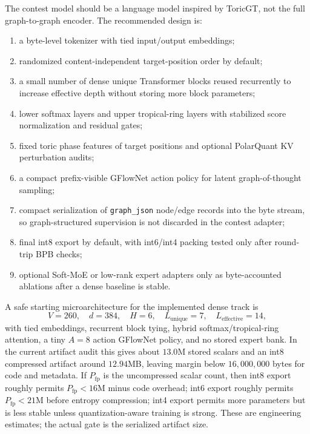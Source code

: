 \documentclass[11pt]{article}
\theoremstyle{definition}
\theoremstyle{plain}
\theoremstyle{remark}
\numberwithin{equation}{section}
\begin{document}
The contest model should be a language model inspired by ToricGT, not the full graph-to-graph encoder.  The recommended design is:
\begin{enumerate}[leftmargin=2em]
  \item a byte-level tokenizer with tied input/output embeddings;
  \item randomized content-independent target-position order by default;
  \item a small number of dense unique Transformer blocks reused recurrently to increase effective depth without storing more block parameters;
  \item lower softmax layers and upper tropical-ring layers with stabilized score normalization and residual gates;
  \item fixed toric phase features of target positions and optional PolarQuant KV perturbation audits;
  \item a compact prefix-visible GFlowNet action policy for latent graph-of-thought sampling;
  \item compact serialization of \texttt{graph\_json} node/edge records into the byte stream, so graph-structured supervision is not discarded in the contest adapter;
  \item final int8 export by default, with int6/int4 packing tested only after round-trip BPB checks;
  \item optional Soft-MoE or low-rank expert adapters only as byte-accounted ablations after a dense baseline is stable.
\end{enumerate}

A safe starting microarchitecture for the implemented dense track is
\begin{equation}
  V=260,\quad d=384,\quad H=6,\quad
  L_{\mathrm{unique}}=7,\quad L_{\mathrm{effective}}=14,
\end{equation}
with tied embeddings, recurrent block tying, hybrid softmax/tropical-ring attention, a tiny $A=8$ action GFlowNet policy, and no stored expert bank.  In the current artifact audit this gives about $13.0$M stored scalars and an int8 compressed artifact around $12.94$MB, leaving margin below $16{,}000{,}000$ bytes for code and metadata.  If $P_{\mathrm{fp}}$ is the uncompressed scalar count, then int8 export roughly permits $P_{\mathrm{fp}}<16$M minus code overhead; int6 export roughly permits $P_{\mathrm{fp}}<21$M before entropy compression; int4 export permits more parameters but is less stable unless quantization-aware training is strong.  These are engineering estimates; the actual gate is the serialized artifact size.
\end{document}
